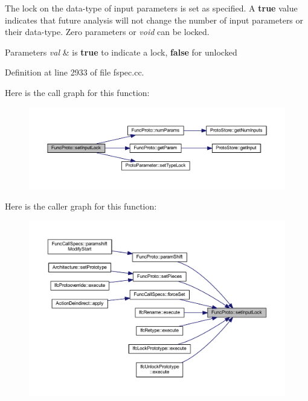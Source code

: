 The lock on the data-\/type of input parameters is set as specified. A {\bfseries{true}} value indicates that future analysis will not change the number of input parameters or their data-\/type. Zero parameters or {\itshape void} can be locked. 
\begin{DoxyParams}{Parameters}
{\em val} & is {\bfseries{true}} to indicate a lock, {\bfseries{false}} for unlocked \\
\hline
\end{DoxyParams}


Definition at line 2933 of file fspec.\+cc.

Here is the call graph for this function\+:
\nopagebreak
\begin{figure}[H]
\begin{center}
\leavevmode
\includegraphics[width=350pt]{class_func_proto_a4afe216709633a3b075111d6f1b7148f_cgraph}
\end{center}
\end{figure}
Here is the caller graph for this function\+:
\nopagebreak
\begin{figure}[H]
\begin{center}
\leavevmode
\includegraphics[width=350pt]{class_func_proto_a4afe216709633a3b075111d6f1b7148f_icgraph}
\end{center}
\end{figure}
\mbox{\label{class_func_proto_af69f89b0b3c5165e521d33b658599699}} 
